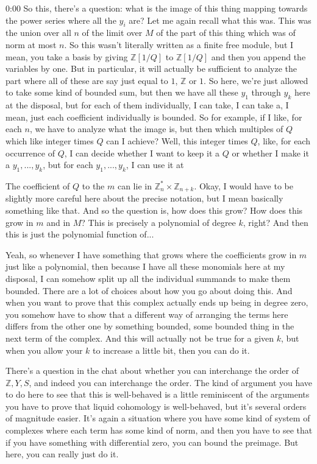 \begin{unfinished}{0:00}
So this, there's a question: what is the image of this thing mapping towards the power series where all the $y_i$ are? Let me again recall what this was. This was the union over all $n$ of the limit over $M$ of the part of this thing which was of norm at most $n$. So this wasn't literally written as a finite free module, but I mean, you take a basis by giving $\mathbb{Z}[1/Q]$ to $\mathbb{Z}[1/Q]$ and then you append the variables by one. But in particular, it will actually be sufficient to analyze the part where all of these are say just equal to $1$, $\mathbb{Z}$ or $1$. So here, we're just allowed to take some kind of bounded sum, but then we have all these $y_1$ through $y_k$ here at the disposal, but for each of them individually, I can take, I can take a, I mean, just each coefficient individually is bounded. So for example, if I like, for each $n$, we have to analyze what the image is, but then which multiples of $Q$ which like integer times $Q$ can I achieve? Well, this integer times $Q$, like, for each occurrence of $Q$, I can decide whether I want to keep it a $Q$ or whether I make it a $y_1,...,y_k$, but for each $y_1,...,y_k$, I can use it at

The coefficient of $Q$ to the $m$ can lie in $\mathbb{Z}_n^* \times \mathbb{Z}_{n+k}$. Okay, I would have to be slightly more careful here about the precise notation, but I mean basically something like that. And so the question is, how does this grow? How does this grow in $m$ and in $M$? This is precisely a polynomial of degree $k$, right? And then this is just the polynomial function of...

Yeah, so whenever I have something that grows where the coefficients grow in $m$ just like a polynomial, then because I have all these monomials here at my disposal, I can somehow split up all the individual summands to make them bounded. There are a lot of choices about how you go about doing this. And when you want to prove that this complex actually ends up being in degree zero, you somehow have to show that a different way of arranging the terms here differs from the other one by something bounded, some bounded thing in the next term of the complex. And this will actually not be true for a given $k$, but when you allow your $k$ to increase a little bit, then you can do it.

There's a question in the chat about whether you can interchange the order of $\mathbb{Z} , Y ,S$, and indeed you can interchange the order. The kind of argument you have to do here to see that this is well-behaved is a little reminiscent of the arguments you have to prove that liquid cohomology is well-behaved, but it's several orders of magnitude easier. It's again a situation where you have some kind of system of complexes where each term has some kind of norm, and then you have to see that if you have something with differential zero, you can bound the preimage. But here, you can really just do it.


\end{unfinished}
